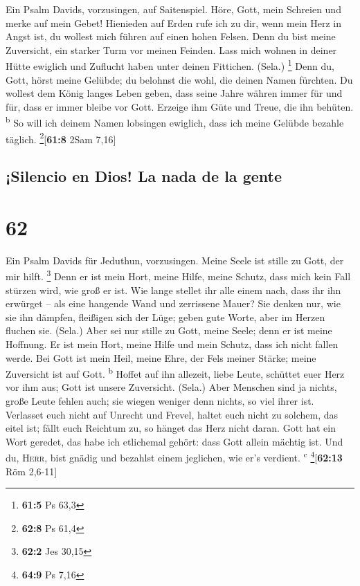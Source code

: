  Ein Psalm Davids, vorzusingen, auf Saitenspiel.
 Höre, Gott, mein Schreien und merke auf mein Gebet!
 Hienieden auf Erden rufe ich zu dir, wenn mein Herz in
Angst ist, du wollest mich führen auf einen hohen Felsen. 
Denn du bist meine Zuversicht, ein starker Turm vor meinen Feinden.
 Lass mich wohnen in deiner Hütte ewiglich und Zuflucht
haben unter deinen Fittichen. (Sela.) \footnote{\textbf{61:5} Ps 63,3}
 Denn du, Gott, hörst meine Gelübde; du belohnst die wohl,
die deinen Namen fürchten.  Du wollest dem König langes
Leben geben, dass seine Jahre währen immer für und für, 
dass er immer bleibe vor Gott. Erzeige ihm Güte und Treue, die ihn
behüten. \textsuperscript{b}  So will ich deinem Namen
lobsingen ewiglich, dass ich meine Gelübde bezahle täglich.
\footnote{\textbf{62:8} Ps 61,4}{[}\textbf{61:8} 2Sam 7,16{]}

\hypertarget{silencio-en-dios-la-nada-de-la-gente}{%
\subsection{¡Silencio en Dios! La nada de la
gente}\label{silencio-en-dios-la-nada-de-la-gente}}

\hypertarget{section-61}{%
\section{62}\label{section-61}}

 Ein Psalm Davids für Jeduthun, vorzusingen.
 Meine Seele ist stille zu Gott, der mir hilft.
\footnote{\textbf{62:2} Jes 30,15}  Denn er ist mein Hort,
meine Hilfe, meine Schutz, dass mich kein Fall stürzen wird, wie groß er
ist.  Wie lange stellet ihr alle einem nach, dass ihr ihn
erwürget -- als eine hangende Wand und zerrissene Mauer? 
Sie denken nur, wie sie ihn dämpfen, fleißigen sich der Lüge; geben gute
Worte, aber im Herzen fluchen sie. (Sela.)  Aber sei nur
stille zu Gott, meine Seele; denn er ist meine Hoffnung. 
Er ist mein Hort, meine Hilfe und mein Schutz, dass ich nicht fallen
werde.  Bei Gott ist mein Heil, meine Ehre, der Fels
meiner Stärke; meine Zuversicht ist auf Gott. \textsuperscript{b}
 Hoffet auf ihn allezeit, liebe Leute, schüttet euer Herz
vor ihm aus; Gott ist unsere Zuversicht. (Sela.)  Aber
Menschen sind ja nichts, große Leute fehlen auch; sie wiegen weniger
denn nichts, so viel ihrer ist.  Verlasset euch nicht auf
Unrecht und Frevel, haltet euch nicht zu solchem, das eitel ist; fällt
euch Reichtum zu, so hänget das Herz nicht daran.  Gott
hat ein Wort geredet, das habe ich etlichemal gehört: dass Gott allein
mächtig ist.  Und du, \textsc{Herr}, bist gnädig und
bezahlst einem jeglichen, wie er's verdient. \textsuperscript{c}
\footnote{\textbf{64:9} Ps 7,16}{[}\textbf{62:13} Röm 2,6-11{]}

